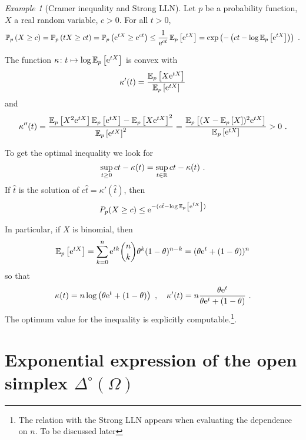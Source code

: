 \documentclass[12pt,a4paper]{amsart}
\theoremstyle{plain}%
\theoremstyle{definition}
\theoremstyle{remark}
\newtheorem{example}{Example}
\begin{document}
\begin{example}[Cramer inequality and Strong LLN] \label{ex:cramer}
Let $p$ be a probability function, $X$ a real random variable, $c >0$. For all $t > 0$,
\begin{equation*}
  \operatorname{\mathbb P}_{p}\left( X \geq c\right) = \operatorname{\mathbb P}_{p}\left(tX \geq ct\right) = \operatorname{\mathbb P}_{p}\left(\mathrm{e}^{tX} \geq \mathrm{e}^{ct}\right) \leq \frac1{\mathrm{e}^{ct}} \operatorname{\mathbb E}_{p}\left[\mathrm{e}^{tX}\right] = \exp\left(- \left(ct - \log\operatorname{\mathbb E}_{p}\left[\mathrm{e}^{tX}\right]\right)\right) \ . 
\end{equation*}

The function $\kappa \colon t \mapsto \log \operatorname{\mathbb E}_{p}\left[\mathrm{e}^{tX}\right]$ is convex with
\begin{equation*}
  \kappa'(t) = \frac{\operatorname{\mathbb E}_{p}\left[X \mathrm{e}^{tX}\right]}{\operatorname{\mathbb E}_{p}\left[\mathrm{e}^{tX}\right]} 
\end{equation*}
and
\begin{equation*}
  \kappa''(t) = \frac{\expectat p {X^2\euler^{tX}}\expectat p {\euler^{tX}} - \expectat p {X\euler^{tX}}^2}{\expectat p {\euler^{tX}}^2} = \frac{\expectat p {(X - \expectat p X)^2 \euler^{tX}}}{\expectat p {\euler^{tX}}} > 0 \ .
\end{equation*}

To get the optimal inequality we look for
\begin{equation*}
  \sup_{t \geq 0}{ct - \kappa(t)} = \sup_{t \in \mathbb{R}} ct - \kappa(t) \ .
\end{equation*}
If $\hat t$ is the solution of $c\hat t = \kappa'(\hat t)$, then
\begin{equation*}
  P_p(X \geq c) \leq \mathrm{e}^{-(c\hat t - \log \operatorname{\mathbb E}_{p}\left[\mathrm{e}^{\hat tX}\right])}
\end{equation*}

In particular, if $X$ is binomial, then
\begin{equation*}
  \operatorname{\mathbb E}_{p}\left[\mathrm{e}^{tX}\right] = \sum_{k=0}^n \mathrm{e}^{tk} \binom n k \theta^k (1-\theta)^{n-k} = (\theta \mathrm{e}^t + (1 - \theta))^n 
\end{equation*}
so that
\begin{equation*}
  \kappa(t) = n \log\left(\theta \mathrm{e}^t + (1 - \theta)\right) \ , \quad \kappa'(t) = n \frac{\theta\mathrm{e}^t}{\theta \mathrm{e}^t + (1 - \theta)} \ .
\end{equation*}
The optimum value for the inequality is explicitly computable.\footnote{The relation with the Strong LLN appears when evaluating the dependence on $n$. To be discussed later}.
\end{example}

\section{Exponential expression of the open simplex $\Delta^\circ(\Omega)$}
\label{sec:expon-expr-delt}
\end{document}
